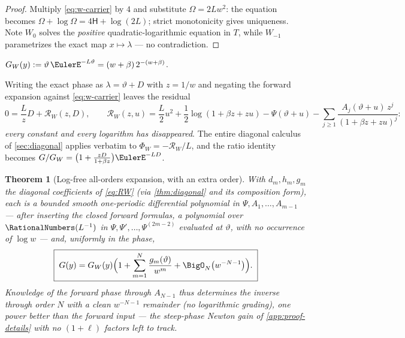 \documentclass[11pt,oneside]{article}
\numberwithin{equation}{section}
\newtheorem{theorem}{Theorem}[section]
\theoremstyle{definition}
\theoremstyle{remark}
\newcommand{\LambertW}{W}
\begin{document}
\begin{proof}
Multiply \eqref{eq:w-carrier} by $4$ and substitute
$\Omega=2Lw^{2}$: the equation becomes
$\Omega+\log\Omega=4\mathsf H+\log(2L)$; strict monotonicity gives
uniqueness.  Note $\LambertW_0$ solves the \emph{positive}
quadratic-logarithmic equation in $T$, while $\LambertW_{-1}$
parametrizes the exact map $x\mapsto\lambda$ --- no contradiction.
\end{proof}

\begin{definition}
$G_W(y):=\vartheta\,\EulerE^{-L\vartheta}
=(w+\beta)\,2^{-(w+\beta)}$.
\end{definition}

Writing the exact phase as $\lambda=\vartheta+D$ with $z=1/w$ and
negating the forward expansion against \eqref{eq:w-carrier} leaves the
residual
\begin{equation}
 0=\frac Lz D+\mathcal R_W(z,D),
 \qquad
 \mathcal R_W(z,u)=
 \frac L2u^{2}+\frac12\log(1+\beta z+zu)
 -\Psi(\vartheta+u)
 -\sum_{j\ge1}\frac{A_j(\vartheta+u)\,z^{j}}{(1+\beta z+zu)^{j}}:
 \label{eq:RW}
\end{equation}
\emph{every constant and every logarithm has disappeared}.  The
entire diagonal calculus of \cref{sec:diagonal} applies verbatim to
$\Phi_W=-\mathcal R_W/L$, and the ratio identity becomes
$G/G_W=\bigl(1+\tfrac{zD}{1+\beta z}\bigr)\EulerE^{-LD}$.

\begin{theorem}[Log-free all-orders expansion, with an extra order]
\label{thm:W-all-orders}
With $d_m,h_m,g_m$ the diagonal coefficients of
\eqref{eq:RW} (via \cref{thm:diagonal} and its composition form),
each is a \emph{bounded} smooth one-periodic differential polynomial
in $\Psi,A_1,\dots,A_{m-1}$ --- after inserting the closed forward
formulas, a polynomial over $\RationalNumbers(L^{-1})$ in
$\Psi,\Psi',\dots,\Psi^{(2m-2)}$ evaluated at $\vartheta$, with no
occurrence of $\log w$ --- and, uniformly in the phase,
\begin{equation}
 \boxed{\;
 G(y)=G_W(y)\Bigl(1+\sum_{m=1}^{N}\frac{g_m(\vartheta)}{w^{m}}
 +\BigO_N\bigl(w^{-N-1}\bigr)\Bigr).
 \;}
 \label{eq:W-expansion}
\end{equation}
Knowledge of the forward phase through $A_{N-1}$ thus determines the
inverse through order $N$ with a \emph{clean} $w^{-N-1}$ remainder
(no logarithmic grading), one power better than the forward input ---
the steep-phase Newton gain of
\cref{app:proof-details} with no $(1+\ell)$ factors left to track.
\end{theorem}
\end{document}
